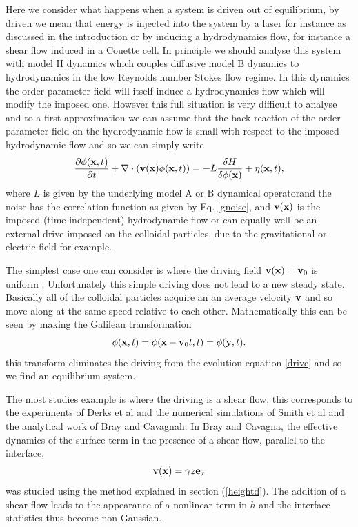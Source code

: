 Here we consider what happens when a system is driven out of equilibrium, by driven we mean that energy is injected into the system by a laser for instance as discussed in the introduction or by inducing a hydrodynamics flow, for instance a shear flow induced in a Couette cell. In principle we should analyse this system with model H dynamics which couples diffusive model B dynamics to hydrodynamics in the low Reynolds number Stokes flow regime. In this dynamics the order parameter field will itself induce a hydrodynamics flow which will modify
the imposed one. However this full situation is very difficult to analyse and to a first approximation we can assume that the back reaction of the order parameter field on the hydrodynamic flow is small with respect to the imposed hydrodynamic flow and so we can simply write
\begin{equation}
\frac{\partial \phi ({\bf x},t)}{\partial t} + \nabla\cdot({\bf  v}({\bf x})\phi({\bf x},t)) =- L\frac{\delta H}{\delta \phi({\bf x})} + \eta({\bf x},t),\label{drive}
\end{equation}
where $L$ is given by the underlying model A or B dynamical operatorand the noise has the correlation function as given by Eq. \eqref{gnoise}, and ${\bf v}({\bf x})$ is the imposed (time independent) hydrodynamic flow or can equally well be an external drive imposed on the colloidal particles, due to the gravitational or electric field for example. 

The simplest case one can consider is where the driving field ${\bf v}({\bf x}) ={\bf v}_0$ is uniform . Unfortunately this simple driving does not lead to a new steady state. Basically all of the colloidal particles acquire an an average velocity ${\bf v}$ and so move along at the same speed relative to each other. Mathematically this can be seen by making the Galilean transformation
\begin{equation}
\phi ({\bf x},t)= \phi({\bf x}-{\bf v}_0t,t) = \phi({\bf y},t).
\end{equation}
this transform eliminates the driving from the evolution equation \eqref{drive} and so we find an equilibrium system. 

The most studies example is where the driving is a shear flow, this corresponds to the experiments of Derks et al and the numerical simulations of Smith et al and the analytical work
of Bray and Cavagnah. In Bray and Cavagna, the effective dynamics of the surface term 
in the presence of a shear flow, parallel to the interface,
\begin{equation}
{\bf v}({\bf x}) = \gamma z {\bf e}_x
\end{equation}
was studied using the method explained in section (\ref{heightd}). The addition of a shear flow leads to the appearance of a nonlinear term in $h$ and the interface statistics thus become non-Gaussian.

